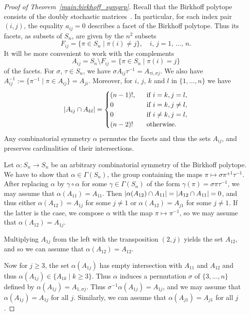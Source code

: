 \documentclass[ALCO,Unicode]{cedram}
\renewcommand{\geq}{\geqslant}
\DeclarePairedDelimiter{\card}{\lvert}{\rvert}  %
\begin{document}
\begin{proof}[Proof of Theorem~\ref{main:birkhoff_symgrp}]
  Recall that the Birkhoff polytope consists of the doubly
  stochastic matrices~\cite[Corollary~1.4.14]{LovaszPlummer86}.
  In particular, for each index pair $(i,j)$,
  the equality
  $a_{ij}=0$ describes a facet of the Birkhoff polytope.
  Thus its facets, as subsets of $S_n$, are given by
  the $n^2$ subsets
  \[ F_{ij} = \{\pi\in S_n \mid \pi(i)\neq j \},
     \quad \text{$i$, $j=1$, $\dotsc $, $n$}.
  \]
  It will be more convenient to work with the complements
  \[ A_{ij}= S_n \setminus F_{ij}
           = \{ \pi \in S_n \mid \pi(i)=j \}
  \] 
  of the facets.
  For $\sigma$, $\tau\in S_n$, 
  we have 
  $\sigma A_{ij} \tau^{-1} = A_{\tau i, \sigma j} $.
  We also have 
  $ A_{ij}^{-1} := \{ \pi^{-1} 
                      \mid \pi \in A_{ij}
                   \}
                 = A_{ji}$.
  Moreover, for $i$, $j$, $k$ and $l$ in $\{1,\dotsc,n\}$
  we have
  \[ \card{A_{ij}\cap A_{kl}}
      =
      \begin{cases}
        (n-1)!, & \text{if } i=k, j=l, \\
        0       & \text{if } i=k, j\neq l,\\
        0       & \text{if } i\neq k, j=l, \\
        (n-2)! \quad & \text{otherwise}.
      \end{cases}
  \]  
  Any combinatorial symmetry $\alpha$ permutes the facets and thus
  the sets $A_{ij}$, and preserves cardinalities of their
  intersections.
  
  Let $\alpha\colon S_n \to S_n$ be an arbitrary
  combinatorial symmetry of the Birkhoff polytope.
  We have to show that $\alpha\in \Gamma(S_n)$,
  the group containing the maps
  $\pi \mapsto \sigma \pi^{\pm 1} \tau^{-1}$.
  After replacing $\alpha$ by $\gamma \circ \alpha$
  for some $\gamma\in \Gamma(S_n)$ of the form
  $\gamma(\pi) = \sigma \pi \tau^{-1}$,
  we may  assume that $\alpha(A_{11})= A_{11}$.
  Then $\card{\alpha(A_{12})\cap A_{11}} = \card{A_{12}\cap A_{11}}=0$,
  and thus either $\alpha(A_{12})= A_{1j}$ for some $j\neq 1$
  or $\alpha(A_{12})=A_{j1}$ for some $j\neq 1$.
  If the latter is the case, we compose $\alpha$
  with the map $\pi\mapsto \pi^{-1}$,
  so we may assume that $\alpha(A_{12})=A_{1j}$.
  
  Multiplying $A_{1j}$ from the left with the transposition
  $(2,j)$ yields the set $A_{12}$,
  and so we can assume that $\alpha(A_{12})= A_{12}$.
  
  Now for $j\geq 3$, the set $\alpha(A_{1j})$ has empty intersection
  with $A_{11}$ and $A_{12}$ and thus
  $\alpha(A_{1j}) \in \{ A_{1k}\mid k\geq 3\}$.
  Thus $\alpha$ induces a permutation 
  $\sigma$ of $\{3,\dotsc, n\}$ defined by
  $\alpha(A_{1j})= A_{1,\sigma j}$.
  Thus $\sigma^{-1} \alpha(A_{1j})= A_{1j}$,
  and we may assume that $\alpha(A_{1j})=A_{1j}$
  for all $j$.
  Similarly, we can assume that
  $\alpha(A_{j1})= A_{j1}$ for all $j$.
  

\end{proof}
\end{document}
